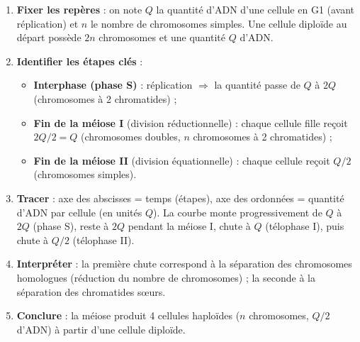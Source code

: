\documentclass[11pt]{article}
\begin{document}
\begin{methode}[Construire la courbe $Q_{\text{ADN}} = f(t)$ au cours de la méiose]
\begin{enumerate}
\item \textbf{Fixer les repères} : on note $Q$ la quantité d'ADN d'une cellule en G1 (avant réplication) et $n$ le nombre de chromosomes simples. Une cellule diploïde au départ possède $2n$ chromosomes et une quantité $Q$ d'ADN.
\item \textbf{Identifier les étapes clés} :
\begin{itemize}
\item \textbf{Interphase (phase S)} : réplication $\Rightarrow$ la quantité passe de $Q$ à $2Q$ (chromosomes à 2 chromatides) ;
\item \textbf{Fin de la méiose I} (division réductionnelle) : chaque cellule fille reçoit $2Q/2 = Q$ (chromosomes doubles, $n$ chromosomes à 2 chromatides) ;
\item \textbf{Fin de la méiose II} (division équationnelle) : chaque cellule reçoit $Q/2$ (chromosomes simples).
\end{itemize}
\item \textbf{Tracer} : axe des abscisses = temps (étapes), axe des ordonnées = quantité d'ADN par cellule (en unités $Q$). La courbe monte progressivement de $Q$ à $2Q$ (phase S), reste à $2Q$ pendant la méiose I, chute à $Q$ (télophase I), puis chute à $Q/2$ (télophase II).
\item \textbf{Interpréter} : la première chute correspond à la séparation des chromosomes homologues (réduction du nombre de chromosomes) ; la seconde à la séparation des chromatides sœurs.
\item \textbf{Conclure} : la méiose produit 4 cellules haploïdes ($n$ chromosomes, $Q/2$ d'ADN) à partir d'une cellule diploïde.
\end{enumerate}
\end{methode}
\end{document}
